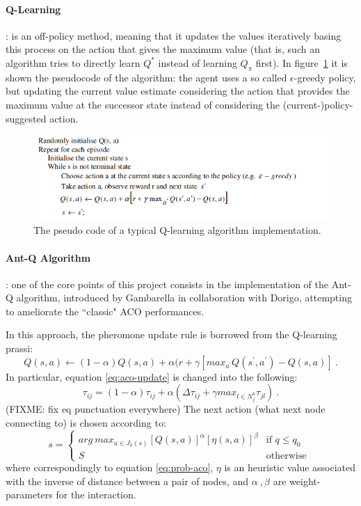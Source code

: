 \paragraph{Q-Learning}: 
is  an  off-policy  method, meaning  that  it updates the values  iteratively basing this process on  the  action that  gives  the  maximum  value  (that is, such an algorithm tries to directly  learn $Q^*$  instead  of  learning $Q_\pi$ first). In figure~\ref{fig:q_pseudo} it is shown the pseudocode of the algorithm:  the  agent  uses  a  so called $\epsilon$-greedy  policy,  but  updating the  current  value  estimate  considering the  action  that  provides  the  maximum  value  at  the successor state instead of considering the (current-)policy-suggested action. 
\begin{figure}
\includegraphics[scale=0.6]{figs/q_pseudo.png}
\caption{\label{fig:q_pseudo} The pseudo code of a typical Q-learning algorithm implementation.}
\end{figure}

\paragraph{Ant-Q Algorithm}:
one of the core points of this project consists in the implementation of the Ant-Q algorithm, introduced by Gambarella \cite{undici} in collaboration with Dorigo, attempting to ameliorate the ``classic" ACO performances.  

In this approach, the pheromone update rule  is borrowed from the Q-learning prassi:
\begin{equation}
Q(s,a) \leftarrow (1-\alpha) Q(s,a) + \alpha (r + \gamma [max_{a^{'}} Q(s^{'},a^{'})-Q(s,a)]~.
\label{eq:q-eq}
\end{equation}
In particular, equation \ref{eq:aco-update} is changed into the following: 
\begin{equation}
\tau_{ij}= (1-\alpha) \tau_{ij} + \alpha( \Delta \tau_{ij} + \gamma max_{l\in N^k_j}\tau_{jl}) ~.
\label{eq:antq-eq}
\end{equation} 
(FIXME: fix eq punctuation everywhere)
The next action (what next node connecting to) is chosen according to:
\begin{equation}
s = \begin{cases} arg~max_{a \in J_k(s)} [Q(s,a)]^\alpha [\eta(s,a)]^\beta & \mbox{if } q \leq q_0 \\ S & \mbox{otherwise } \end{cases} 
\label{eq:antq-choice}
\end{equation}
where correspondingly to equation \ref{eq:prob-aco}, $\eta$ is an heuristic value associated with the inverse of distance between a pair of nodes, and $\alpha~, \beta$ are weight-parameters for the interaction.

